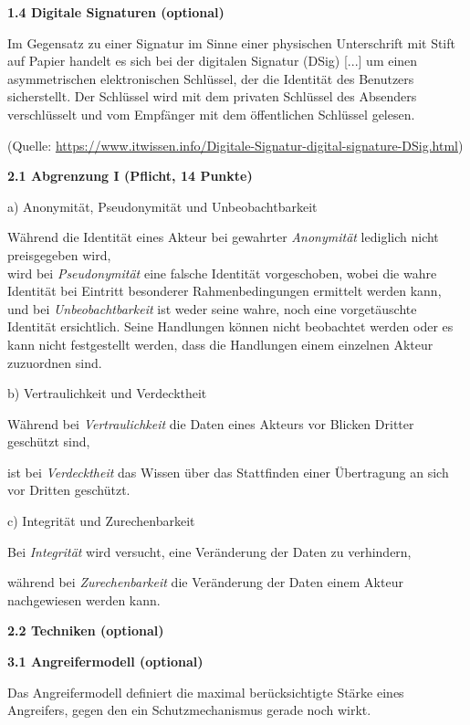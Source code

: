 \documentclass[ngerman]{fbi-aufgabenblatt}
\begin{document}
\textbf{1.4 Digitale Signaturen (optional)}

Im Gegensatz zu einer Signatur im Sinne einer physischen Unterschrift mit Stift auf Papier handelt es sich
\dq bei der digitalen Signatur (DSig) [...] um einen asymmetrischen elektronischen Schlüssel, 
der die Identität des Benutzers sicherstellt. Der Schlüssel wird mit dem privaten Schlüssel des Absenders verschlüsselt 
und vom Empfänger mit dem öffentlichen Schlüssel gelesen.\dq

(Quelle: \url{https://www.itwissen.info/Digitale-Signatur-digital-signature-DSig.html})


%
%

\textbf{2.1 Abgrenzung I (Pflicht, 14 Punkte)}

a) Anonymität, Pseudonymität und Unbeobachtbarkeit

Während die Identität eines Akteur bei gewahrter \emph{Anonymität} lediglich nicht preisgegeben wird,\\
wird bei \emph{Pseudonymität} eine falsche Identität vorgeschoben, wobei die wahre Identität bei Eintritt besonderer Rahmenbedingungen ermittelt werden kann,\\
und bei \emph{Unbeobachtbarkeit} ist weder seine wahre, noch eine vorgetäuschte Identität ersichtlich. Seine Handlungen können nicht beobachtet werden oder es kann nicht festgestellt werden, dass die Handlungen einem einzelnen Akteur zuzuordnen sind.  

b) Vertraulichkeit und Verdecktheit

Während bei \emph{Vertraulichkeit} die Daten eines Akteurs vor Blicken Dritter geschützt sind,

ist bei \emph{Verdecktheit} das Wissen über das Stattfinden einer Übertragung an sich vor Dritten geschützt.

c) Integrität und Zurechenbarkeit

Bei \emph{Integrität} wird versucht, eine Veränderung der Daten zu verhindern, 

während bei \emph{Zurechenbarkeit} die Veränderung der Daten einem Akteur nachgewiesen werden kann.

\textbf{2.2 Techniken (optional)}


\newpage
{}

\textbf{3.1 Angreifermodell (optional)}

Das Angreifermodell definiert die maximal berücksichtigte Stärke eines
Angreifers, gegen den ein Schutzmechanismus gerade noch wirkt.
\end{document}
